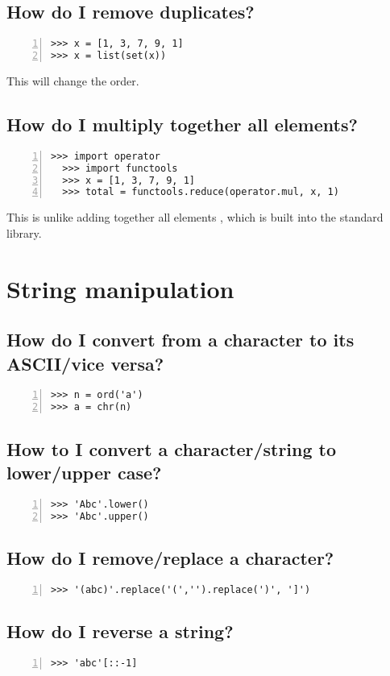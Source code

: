 \documentclass[12pt]{article}
\begin{document}
\subsection{How do I remove duplicates?}
\begin{lstlisting}[numbers=left]
>>> x = [1, 3, 7, 9, 1]
>>> x = list(set(x))
\end{lstlisting}
This will change the order.

\subsection{How do I multiply together all elements?}
\begin{lstlisting}[numbers=left]
  >>> import operator
  >>> import functools
  >>> x = [1, 3, 7, 9, 1]
  >>> total = functools.reduce(operator.mul, x, 1)
\end{lstlisting}
This is unlike adding together all elements , which is built into the standard library.

\section{String manipulation}
\subsection{How do I convert from a character to its ASCII/vice versa?}
\begin{lstlisting}[numbers=left]
>>> n = ord('a')
>>> a = chr(n)
\end{lstlisting}

\subsection{How to I convert a character/string to lower/upper case?}
\begin{lstlisting}[numbers=left]
>>> 'Abc'.lower()
>>> 'Abc'.upper()
\end{lstlisting}

\subsection{How do I remove/replace a character?}
\begin{lstlisting}[numbers=left]
>>> '(abc)'.replace('(','').replace(')', ']')
\end{lstlisting}

\subsection{How do I reverse a string?}
\begin{lstlisting}[numbers=left]
>>> 'abc'[::-1]
\end{lstlisting}
\end{document}
